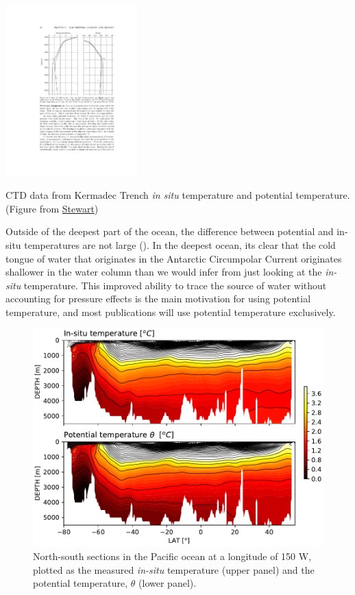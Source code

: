 \begin{marginfigure}
\begin{center}
  \includegraphics[width=2in]{figs/Trench}
  \caption{CTD data from Kermadec Trench \citep{Warren73} \emph{in situ} temperature and potential temperature. (Figure from \href{http://oaktrust.library.tamu.edu/handle/1969.1/160216}{Stewart})}
  \label{fig:Trench}
  \end{center}
\end{marginfigure}

Outside of the deepest part of the ocean, the difference between potential and in-situ temperatures are not large ().  In the deepest ocean, its clear that the cold tongue of water that originates in the Antarctic Circumpolar Current originates shallower in the water column than we would infer from just looking at the \emph{in-situ} temperature.  This improved ability to trace the source of water without accounting for pressure effects is the main motivation for using potential temperature, and most publications will use potential temperature exclusively.  

\begin{figure}[hbt]
  \begin{center}
    \includegraphics[width=5in]{./figs/P16Temp.pdf}
    \caption{North-south sections in the Pacific ocean at a longitude of 150 W, plotted as the measured \emph{in-situ} temperature (upper panel) and the potential temperature, $\theta$ (lower panel).    }
    \label{fig:P16Temp}  
  \end{center}
\end{figure}

